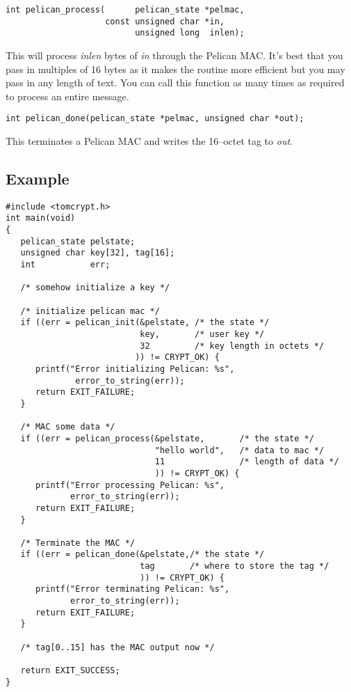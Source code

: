 \documentclass[synpaper]{book}
\begin{document}
\begin{verbatim}
int pelican_process(      pelican_state *pelmac, 
                    const unsigned char *in, 
                          unsigned long  inlen);
\end{verbatim}
This will process \textit{inlen} bytes of \textit{in} through the Pelican MAC.  It's best that you pass in multiples of 16 bytes as it makes the
routine more efficient but you may pass in any length of text.  You can call this function as many times as required to process
an entire message.

\begin{verbatim}
int pelican_done(pelican_state *pelmac, unsigned char *out);
\end{verbatim}
This terminates a Pelican MAC and writes the 16--octet tag to \textit{out}.

\subsection{Example}

\begin{verbatim}
#include <tomcrypt.h>
int main(void)
{
   pelican_state pelstate;
   unsigned char key[32], tag[16];
   int           err;

   /* somehow initialize a key */

   /* initialize pelican mac */
   if ((err = pelican_init(&pelstate, /* the state */
                           key,       /* user key */
                           32         /* key length in octets */
                          )) != CRYPT_OK) {
      printf("Error initializing Pelican: %s", 
              error_to_string(err));
      return EXIT_FAILURE;
   }

   /* MAC some data */
   if ((err = pelican_process(&pelstate,       /* the state */
                              "hello world",   /* data to mac */        
                              11               /* length of data */
                              )) != CRYPT_OK) {
      printf("Error processing Pelican: %s", 
             error_to_string(err));
      return EXIT_FAILURE;
   }

   /* Terminate the MAC */
   if ((err = pelican_done(&pelstate,/* the state */
                           tag       /* where to store the tag */
                           )) != CRYPT_OK) {
      printf("Error terminating Pelican: %s", 
             error_to_string(err));
      return EXIT_FAILURE;
   }

   /* tag[0..15] has the MAC output now */

   return EXIT_SUCCESS;
}
\end{verbatim}
\end{document}
